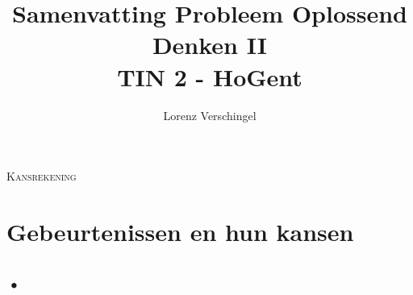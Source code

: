 \documentclass[a4paper,12pt]{article}
\title{Samenvatting Probleem Oplossend Denken II \\ \large TIN 2 - HoGent}
\author{Lorenz Verschingel}
\begin{document}
\maketitle
\huge \textsc{Kansrekening}
\section{Gebeurtenissen en hun kansen}
\subsection{•}
\end{document}
